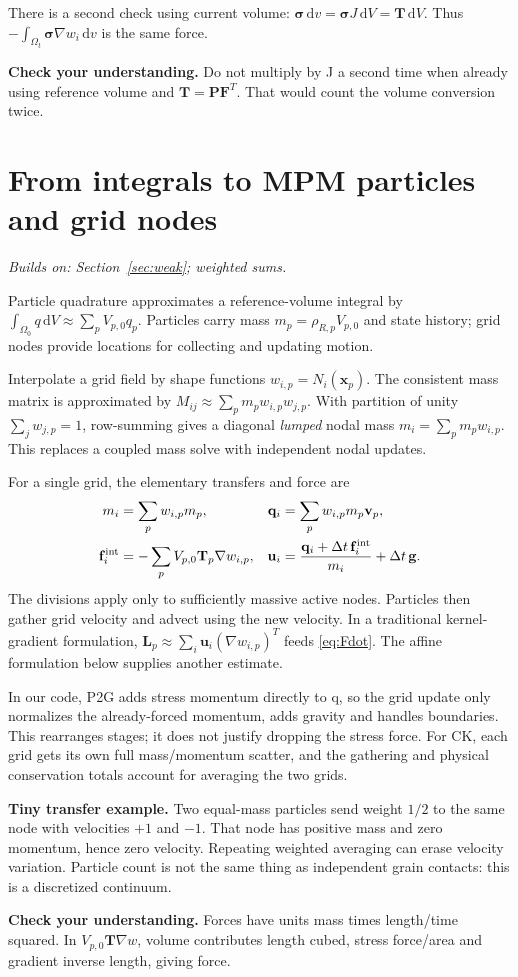 \documentclass[11pt,a4paper]{article}
\newcommand{\mat}[1]{\mathbf{#1}}
\newcommand{\prereq}[1]{\textit{Builds on: #1}\par}
\newcommand{\checkpoint}[1]{\par\textbf{Check your understanding.} #1\par}
\numberwithin{equation}{section}
\begin{document}
There is a second check using current volume:
$\boldsymbol\sigma\,\mathrm dv
=\boldsymbol\sigma J\,\mathrm dV=\mat T\,\mathrm dV$.
Thus $-\int_{\Omega_t}\boldsymbol\sigma\nabla w_i\,\mathrm dv$ is the same force.
\checkpoint{Do not multiply by J a second time when already using reference
volume and $\mat T=\mat P\mat F^T$. That would count the volume conversion twice.}

\section{From integrals to MPM particles and grid nodes}\label{sec:mpm}
\prereq{Section~\ref{sec:weak}; weighted sums.}
Particle quadrature approximates a reference-volume integral by
$\int_{\Omega_0}q\,\mathrm dV\approx\sum_p V_{p,0}q_p$.
Particles carry mass $m_p=\rho_{R,p}V_{p,0}$ and state history; grid nodes provide
locations for collecting and updating motion.

Interpolate a grid field by shape functions $w_{i,p}=N_i(\mat x_p)$.
The consistent mass matrix is approximated by
$M_{ij}\approx\sum_p m_p w_{i,p}w_{j,p}$.
With partition of unity $\sum_jw_{j,p}=1$, row-summing gives a diagonal
\emph{lumped} nodal mass $m_i=\sum_p m_pw_{i,p}$. This replaces a coupled mass
solve with independent nodal updates.

For a single grid, the elementary transfers and force are
\begin{align}
m_i&=\sum_p w_{i,p}m_p,&
\mat q_i&=\sum_p w_{i,p}m_p\mat v_p,\label{eq:p2g-basic}\\
\mat f_i^{\rm int}&=-\sum_p V_{p,0}\mat T_p\nabla w_{i,p},&
\mat u_i&=\frac{\mat q_i+\Delta t\,\mat f_i^{\rm int}}{m_i}
                 +\Delta t\,\mat g.\label{eq:grid-basic}
\end{align}
The divisions apply only to sufficiently massive active nodes. Particles then
gather grid velocity and advect using the new velocity. In a traditional
kernel-gradient formulation, $\mat L_p\approx\sum_i\mat u_i(\nabla w_{i,p})^T$
feeds \eqref{eq:Fdot}. The affine formulation below supplies another estimate.

In our code, P2G adds stress momentum directly to q, so the grid update only
normalizes the already-forced momentum, adds gravity and handles boundaries.
This rearranges stages; it does not justify dropping the stress force.
For CK, each grid gets its own full mass/momentum scatter, and the gathering
and physical conservation totals account for averaging the two grids.

\textbf{Tiny transfer example.} Two equal-mass particles send weight $1/2$
to the same node with velocities $+1$ and $-1$. That node has positive mass
and zero momentum, hence zero velocity. Repeating weighted averaging can erase
velocity variation. Particle count is not the same thing as independent grain
contacts: this is a discretized continuum.
\checkpoint{Forces have units mass times length/time squared. In
$V_{p,0}\mat T\nabla w$, volume contributes length cubed, stress force/area and
gradient inverse length, giving force.}
\end{document}
